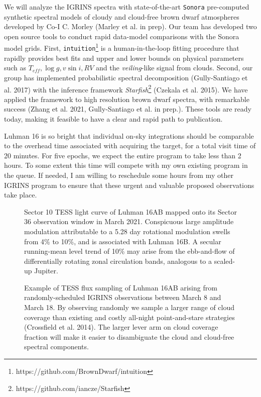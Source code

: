 \documentclass[11pt]{article}
\begin{document}
{We will analyze the IGRINS spectra with state-of-the-art \texttt{Sonora} pre-computed synthetic spectral models of cloudy and cloud-free brown dwarf atmospheres developed by Co-I C. Morley (Marley et al. in prep).  Our team has developed two open source tools to conduct rapid data-model comparisons with the Sonora model grids. First, \texttt{intuition}\footnote{https://github.com/BrownDwarf/intuition} is a human-in-the-loop fitting procedure that rapidly provides best fits and upper and lower bounds on physical parameters such as $T_{eff}, \log{g}, v\sin{i}, RV$ and the \emph{veiling}-like signal from clouds.  Second, our group has implemented probabilistic spectral decomposition (Gully-Santiago et al. 2017) with the inference framework \emph{Starfish}\footnote{https://github.com/iancze/Starfish} (Czekala et al. 2015).  We have applied the framework to high resolution brown dwarf spectra, with remarkable success (Zhang et al. 2021, Gully-Santiago et al. in prep.).  These tools are ready today, making it feasible to have a clear and rapid path to publication.

Luhman 16 is so bright that individual on-sky integrations should be comparable to the overhead time associated with acquiring the target, for a total visit time of 20 minutes.  For five epochs, we expect the entire program to take less than 2 hours.  To some extent this time will compete with my own existing program in the queue.  If needed, I am willing to reschedule some hours from my other IGRINS program to ensure that these urgent and valuable proposed observations take place.

\clearpage

\begin{figure}[h!]
    \caption{Sector 10 TESS light curve of Luhman 16AB mapped onto its Sector 36 observation window in March 2021.  Conspicuous large amplitude modulation attributable to a 5.28 day rotational modulation swells from 4\% to 10\%, and is associated with Luhman 16B.  A secular running-mean level trend of 10\% may arise from the ebb-and-flow of differentially rotating zonal circulation bands, analogous to a scaled-up Jupiter.}
\end{figure}

\begin{figure}[h!]
    \caption{Example of TESS flux sampling of Luhman 16AB arising from randomly-scheduled IGRINS observations between March 8 and March 18.  By observing randomly we sample a larger range of cloud coverage than existing and costly all-night point-and-stare strategies (Crossfield et al. 2014).  The larger lever arm on cloud coverage fraction will make it easier to disambiguate the cloud and cloud-free spectral components.}
\end{figure}
    

}
\end{document}
